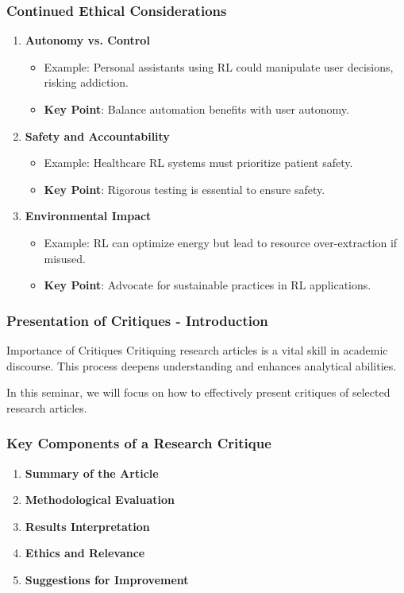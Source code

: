 \documentclass[aspectratio=169]{beamer}
\begin{document}
\begin{frame}[fragile]
    \frametitle{Continued Ethical Considerations}
    \begin{enumerate}[resume]
        \item \textbf{Autonomy vs. Control}
            \begin{itemize}
                \item Example: Personal assistants using RL could manipulate user decisions, risking addiction.
                \item \textbf{Key Point}: Balance automation benefits with user autonomy.
            \end{itemize}
        \item \textbf{Safety and Accountability}
            \begin{itemize}
                \item Example: Healthcare RL systems must prioritize patient safety.
                \item \textbf{Key Point}: Rigorous testing is essential to ensure safety.
            \end{itemize}
        \item \textbf{Environmental Impact}
            \begin{itemize}
                \item Example: RL can optimize energy but lead to resource over-extraction if misused.
                \item \textbf{Key Point}: Advocate for sustainable practices in RL applications.
            \end{itemize}
    \end{enumerate}
\end{frame}

\begin{frame}[fragile]
    \frametitle{Presentation of Critiques - Introduction}
    \begin{block}{Importance of Critiques}
        Critiquing research articles is a vital skill in academic discourse. 
        This process deepens understanding and enhances analytical abilities.
    \end{block}
    In this seminar, we will focus on how to effectively present critiques of selected research articles.
\end{frame}

\begin{frame}[fragile]
    \frametitle{Key Components of a Research Critique}
    \begin{enumerate}
        \item \textbf{Summary of the Article}
        \item \textbf{Methodological Evaluation}
        \item \textbf{Results Interpretation}
        \item \textbf{Ethics and Relevance}
        \item \textbf{Suggestions for Improvement}
    \end{enumerate}
\end{frame}
\end{document}
